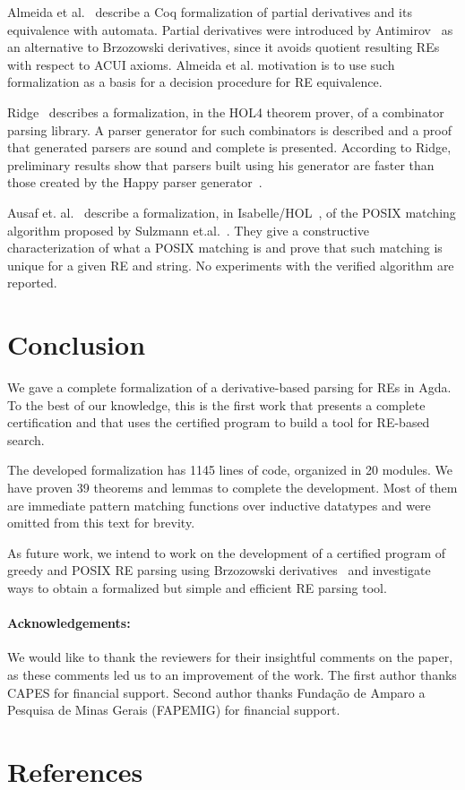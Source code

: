 \documentclass[review]{elsarticle}
\theoremstyle{definition}
\begin{document}
Almeida et al.~\cite{AlmeidaMPS10} describe a Coq formalization of
partial derivatives and its equivalence with automata. Partial
derivatives were introduced by Antimirov~\cite{Antimirov91} as an
alternative to Brzozowski derivatives, since it avoids quotient
resulting REs with respect to ACUI axioms. Almeida et al. motivation
is to use such formalization as a basis for a decision procedure for
RE equivalence.

Ridge~\cite{Ridge2011} describes a formalization, in the HOL4 theorem
prover, of a combinator parsing library. A parser generator for such
combinators is described and a proof that generated parsers are sound
and complete is presented.  According to Ridge, preliminary results
show that parsers built using his generator are faster than those
created by the Happy parser generator~\cite{Happy}.

Ausaf et. al.~\cite{AusafDU16} describe a formalization, in
Isabelle/HOL~\cite{Nipkow02}, of the POSIX matching algorithm proposed
by Sulzmann et.al.~\cite{SulzmannL14}. They give a constructive
characterization of what a POSIX matching is and prove that such
matching is unique for a given RE and string. No experiments with the
verified algorithm are reported.


\section{Conclusion}\label{sec:conclusion}

We gave a complete formalization of a derivative-based parsing
for REs in Agda. To the best of our knowledge, this is the first work
that presents a complete certification and that uses the certified
program to build a tool for RE-based search.

The developed formalization has 1145 lines of code, organized in 20
modules. We have proven 39 theorems and lemmas to complete the
development. Most of them are immediate pattern matching functions
over inductive datatypes and were omitted from this text for brevity.

As future work, we intend to work on the development of a certified
program of greedy and POSIX RE parsing using Brzozowski
derivatives~\cite{SulzmannL14,FrischC04} and investigate ways to
obtain a formalized but simple and efficient RE parsing tool.

\paragraph{Acknowledgements:} We would like to thank the reviewers 
for their insightful comments on the paper, as these comments led us 
to an improvement of the work. The first author thanks CAPES for financial
support. Second author thanks Fundação de Amparo a
Pesquisa de Minas Gerais (FAPEMIG) for financial support.

\section*{References}


\end{document}

